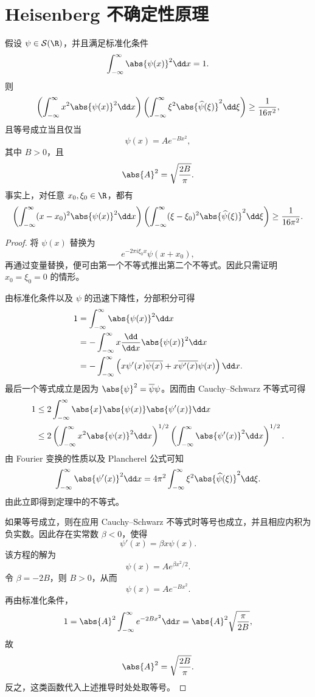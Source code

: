 \section{Heisenberg 不确定性原理}

\begin{theorem}\label{thm:heisenberg-uncertainty}
	假设 $\psi\in\mathcal S(\R)$，并且满足标准化条件
	\[
	\int_{-\infty}^{\infty}\abs{\psi(x)}^2\dd x=1.
	\]
	则
	\[
	\left(\int_{-\infty}^{\infty}x^2\abs{\psi(x)}^2\dd x\right)
	\left(\int_{-\infty}^{\infty}\xi^2\abs{\widehat\psi(\xi)}^2\dd\xi\right)
	\geq \frac{1}{16\pi^2},
	\]
	且等号成立当且仅当
	\[
	\psi(x)=Ae^{-Bx^2},
	\]
	其中 $B>0$，且
	\[
	\abs{A}^2=\sqrt{\frac{2B}{\pi}}.
	\]
	事实上，对任意 $x_0,\xi_0\in\R$，都有
	\[
	\left(\int_{-\infty}^{\infty}(x-x_0)^2\abs{\psi(x)}^2\dd x\right)
	\left(\int_{-\infty}^{\infty}(\xi-\xi_0)^2
	\abs{\widehat\psi(\xi)}^2\dd\xi\right)
	\geq \frac{1}{16\pi^2}.
	\]
\end{theorem}

\begin{proof}
	将 $\psi(x)$ 替换为
	\[
	e^{-2\pi i\xi_0x}\psi(x+x_0),
	\]
	再通过变量替换，便可由第一个不等式推出第二个不等式。因此只需证明 $x_0=\xi_0=0$ 的情形。
	
	由标准化条件以及 $\psi$ 的迅速下降性，分部积分可得
	\[
	\begin{aligned}
		1
		&=\int_{-\infty}^{\infty}\abs{\psi(x)}^2\dd x\\
		&=-\int_{-\infty}^{\infty}x\frac{\dd}{\dd x}
		\abs{\psi(x)}^2\dd x\\
		&=-\int_{-\infty}^{\infty}
		\left(x\psi'(x)\overline{\psi(x)}
		+x\overline{\psi'(x)}\psi(x)\right)\dd x.
	\end{aligned}
	\]
	最后一个等式成立是因为 $\abs{\psi}^2=\overline\psi\psi$。因而由 Cauchy--Schwarz 不等式可得
	\[
	\begin{aligned}
		1
		&\leq 2\int_{-\infty}^{\infty}
		\abs{x}\abs{\psi(x)}\abs{\psi'(x)}\dd x\\
		&\leq 2
		\left(\int_{-\infty}^{\infty}x^2\abs{\psi(x)}^2\dd x\right)^{1/2}
		\left(\int_{-\infty}^{\infty}\abs{\psi'(x)}^2\dd x\right)^{1/2}.
	\end{aligned}
	\]
	由 Fourier 变换的性质以及 Plancherel 公式可知
	\[
	\int_{-\infty}^{\infty}\abs{\psi'(x)}^2\dd x
	=4\pi^2\int_{-\infty}^{\infty}
	\xi^2\abs{\widehat\psi(\xi)}^2\dd\xi.
	\]
	由此立即得到定理中的不等式。
	
	如果等号成立，则在应用 Cauchy--Schwarz 不等式时等号也成立，并且相应内积为负实数。因此存在实常数 $\beta<0$，使得
	\[
	\psi'(x)=\beta x\psi(x).
	\]
	该方程的解为
	\[
	\psi(x)=Ae^{\beta x^2/2}.
	\]
	令 $\beta=-2B$，则 $B>0$，从而
	\[
	\psi(x)=Ae^{-Bx^2}.
	\]
	再由标准化条件，
	\[
	1=\abs{A}^2\int_{-\infty}^{\infty}e^{-2Bx^2}\dd x
	=\abs{A}^2\sqrt{\frac{\pi}{2B}},
	\]
	故
	\[
	\abs{A}^2=\sqrt{\frac{2B}{\pi}}.
	\]
	反之，这类函数代入上述推导时处处取等号。
\end{proof}
